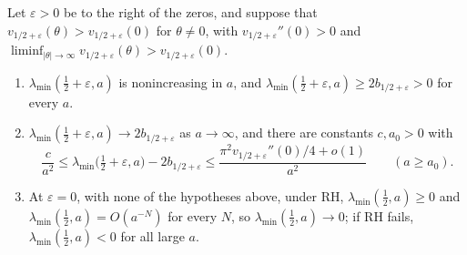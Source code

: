 \begin{theorem}\label{dc:thm:ladder}
Let $\varepsilon>0$ be to the right of the zeros, and suppose that $v_{1/2+\varepsilon}(\theta)>v_{1/2+\varepsilon}(0)$ for $\theta\ne0$, with $v_{1/2+\varepsilon}''(0)>0$ and $\liminf_{|\theta|\to\infty}v_{1/2+\varepsilon}(\theta)>v_{1/2+\varepsilon}(0)$.
\begin{enumerate}
\item[(a)] $\lambda_{\min}(\frac12+\varepsilon,a)$ is nonincreasing in $a$, and $\lambda_{\min}(\frac12+\varepsilon,a)\ge2b_{1/2+\varepsilon}>0$ for every $a$.
\item[(b)] $\lambda_{\min}(\frac12+\varepsilon,a)\to2b_{1/2+\varepsilon}$ as $a\to\infty$, and there are constants $c,a_0>0$ with
\[
\frac{c}{a^2}\le\lambda_{\min}\big(\tfrac12+\varepsilon,a\big)-2b_{1/2+\varepsilon}\le\frac{\pi^2v_{1/2+\varepsilon}''(0)/4+o(1)}{a^2}\qquad(a\ge a_0).
\]
\item[(c)] At $\varepsilon=0$, with none of the hypotheses above, under RH, $\lambda_{\min}(\frac12,a)\ge0$ and $\lambda_{\min}(\frac12,a)=O(a^{-N})$ for every $N$, so $\lambda_{\min}(\frac12,a)\to0$; if RH fails, $\lambda_{\min}(\frac12,a)<0$ for all large $a$.
\end{enumerate}
\end{theorem}

